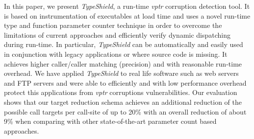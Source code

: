 In this paper, we present \textit{TypeShield}, a run-time \textit{vptr} corruption
detection tool. It is based on instrumentation of executables at load time
and uses a novel run-time type and function parameter counter technique
in order to overcome the limitations of current approaches and efficiently
verify dynamic dispatching during run-time.
In particular, \textit{TypeShield} can be automatically and easily used
in conjunction with legacy applications or where source code is missing.
It achieves higher caller/caller matching (precision) and with reasonable
run-time overhead.
We have applied \textit{TypeShield} to real life software such as
web servers and FTP servers and were able to efficiently
and with low performance overhead protect this applications from 
\textit{vptr} corruptions vulnerabilities.
Our evaluation shows that our target reduction schema achieves an additional
reduction of the possible call targets per call-site of up to 
20\% with an overall reduction of about 9\% when comparing with other state-of-the-art
parameter count based approaches.

